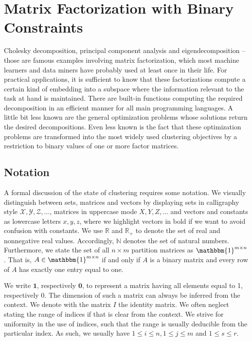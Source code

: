 \chapter{Matrix Factorization with Binary Constraints}
\label{chap:ZeroShades}
Cholesky decomposition, principal component analysis and eigendecomposition -- those are famous examples involving matrix factorization, which most machine learners and data miners have probably used at least once in their life. For practical applications, it is sufficient to know that these factorizations compute a certain kind of embedding into a subspace where the information relevant to the task at hand is maintained. There are built-in functions computing the required decomposition in an efficient manner for all main programming languages. A little bit less known are the general optimization problems whose solutions return the desired decompositions. Even less known is the fact that these optimization problems are transformed into the most widely used clustering objectives by a restriction to binary values of one or more factor matrices. 
\section{Notation}
A formal discussion of the state of clustering requires some notation. We visually distinguish between sets, matrices and vectors by displaying sets in calligraphy style $\mathcal{X},\mathcal{Y},\mathcal{Z},\ldots$, matrices in uppercase mode $X,Y,Z,\ldots$ and vectors and constants as lowercase letters $x,y,z$, where we highlight vectors in bold if we want to avoid confusion with constants. We use $\mathbb{R}$ and $\mathbb{R}_+$ to denote the set of real and nonnegative real values. Accordingly, $\mathbb{N}$ denotes the set of natural numbers. Furthermore, we state the set of all $n\times m$ partition matrices as $\mathbbm{1}^{m\times n}$. That is, $A\in\mathbbm{1}^{m\times n}$ if and only if $A$ is a binary matrix and every row of $A$ has exactly one entry equal to one. 

We write $\mathbf{1}$, respectively $\mathbf{0}$, to represent a matrix having all elements equal to 1, respectively 0. The dimension of such a matrix can always be inferred from the context. We denote with the matrix $I$ the identity matrix.
We often neglect stating the range of indices if that is clear from the context. We strive for uniformity in the use of indices, such that the range is usually deducible from the particular index. As such, we usually have $1\leq i\leq n, 1\leq j\leq m$ and $1\leq s\leq r$.

